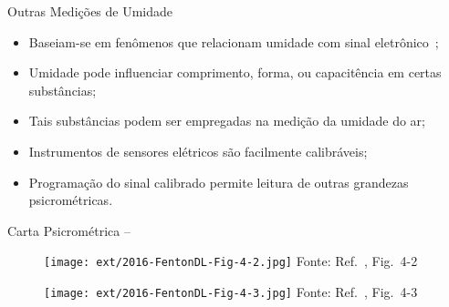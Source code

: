     \begin{frame}{Outras Medições de Umidade}\vspace*{-0em}
        \begin{itemize}
            \item<1-> Baseiam-se em fenômenos que relacionam umidade com \alert{sinal
                eletrônico}~\cite{1985-WylenG-Wiley};
                \\[\medskipamount]
            \item<2-> Umidade pode influenciar \alert{comprimento}, \alert{forma}, ou
                \alert{capacitência} em certas substâncias;
                \\[\medskipamount]
            \item<3-> Tais substâncias podem ser empregadas na \alert{medição da umidade do ar};
                \\[\medskipamount]
            \item<4-> Instrumentos de sensores elétricos são \alert{facilmente calibráveis};
                \\[\medskipamount]
            \item<5-> Programação do sinal calibrado permite leitura de \alert{outras grandezas}
                psicrométricas.
        \end{itemize}
    \end{frame}

    \begin{frame}[allowframebreaks]{Carta Psicrométrica -- }
        \pagebreak
        \begin{center}
            \begin{figure}
                \texttt{[image: ext/2016-FentonDL-Fig-4-2.jpg]}
                Fonte: Ref.~\cite{2016-FentonDL-ASHRAE}, Fig.~4-2
            \end{figure}
        \end{center}
        \pagebreak
        \begin{center}
            \begin{figure}
                \texttt{[image: ext/2016-FentonDL-Fig-4-3.jpg]}
                Fonte: Ref.~\cite{2016-FentonDL-ASHRAE}, Fig.~4-3
            \end{figure}
        \end{center}
    \end{frame}

